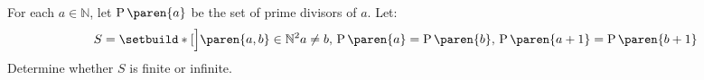 For each $a \in \mathbb{N}$,
let $\operatorname{P}\paren{a}$ be the set of prime divisors of $a$.
Let:
\begin{equation*}
  S = \setbuild*[\Big]{\paren{a, b} \in \mathbb{N}^{2}}{
        a \neq b, \,
        \operatorname{P}\paren{a} = \operatorname{P}\paren{b}, \,
        \operatorname{P}\paren{a + 1} = \operatorname{P}\paren{b + 1}}
\end{equation*}
Determine whether $S$ is finite or infinite.
